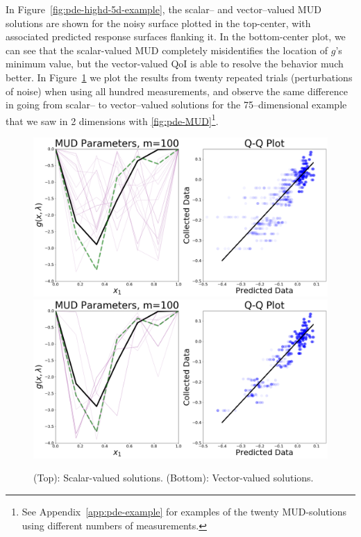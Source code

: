 In Figure~\ref{fig:pde-highd-5d-example}, the scalar-- and vector--valued MUD solutions are shown for the noisy surface plotted in the top-center, with associated predicted response surfaces flanking it.
In the bottom-center plot, we can see that the scalar-valued MUD completely misidentifies the location of $g$'s minimum value, but the vector-valued QoI is able to resolve the behavior much better.
In Figure~\ref{fig:pde-highd-5d-mud} we plot the results from twenty repeated trials (perturbations of noise) when using all hundred measurements, and observe the same difference in going from scalar-- to vector--valued solutions for the 75--dimensional example that we saw in 2 dimensions with \ref{fig:pde-MUD}\footnote{See Appendix~\ref{app:pde-example} for examples of the twenty MUD-solutions using different numbers of measurements.}.

\begin{figure}[htbp]
\centering
  \includegraphics[width=0.95\linewidth]{figures/pde-highd/pde-highd_pair_D5-1_m100}
  \includegraphics[width=0.95\linewidth]{figures/pde-highd/pde-highd_pair_D5-5_m100}
\caption{
(Top): Scalar-valued solutions.
(Bottom): Vector-valued solutions.
}
\label{fig:pde-highd-5d-mud}
\end{figure}

